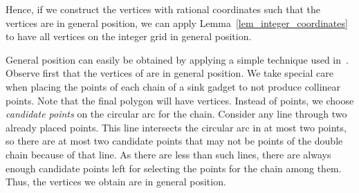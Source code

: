 \documentclass[a4paper,11pt]{article}
\begin{document}
Hence, if we construct the vertices with rational coordinates such that the vertices are in general position, we can apply Lemma~\ref{lem_integer_coordinates} to have all vertices on the integer grid in general position.

General position can easily be obtained by applying a simple technique used in~\cite[Appendix~A]{point_set_hard}.
Observe first that the vertices of  are in general position.
We take special care when placing the  points of each chain of a sink gadget to not produce collinear points.
Note that the final polygon  will have  vertices.
Instead of  points, we choose  \emph{candidate points} on the circular arc for the chain.
Consider any line through two already placed points.
This line intersects the circular arc in at most two points, so there are at most two candidate points that may not be points of the double chain because of that line.
As there are less than  such lines, there are always enough candidate points left for selecting the  points for the chain among them.
Thus, the vertices we obtain are in general position.
\end{document}
